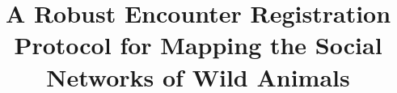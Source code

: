 \documentclass[10pt, conference, letterpaper]{IEEEtran}
\begin{document}
\title{A Robust Encounter Registration Protocol for Mapping the Social Networks of Wild Animals}



\maketitle





% 







% 







\end{document}
